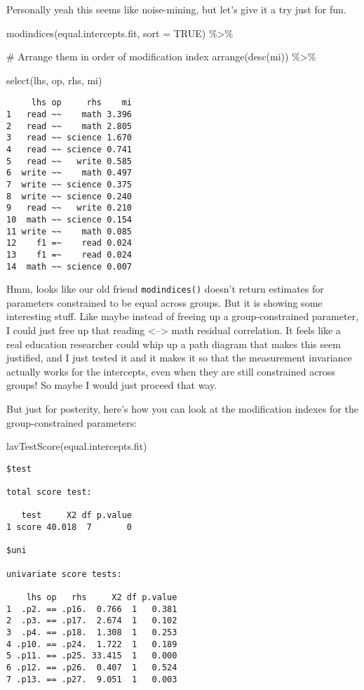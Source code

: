 \documentclass[
  letterpaper,
  DIV=11,
  numbers=noendperiod]{scrreprt}
\newenvironment{Shaded}{\begin{snugshade}}{\end{snugshade}}
\newcommand{\AttributeTok}[1]{\textcolor[rgb]{0.40,0.45,0.13}{#1}}
\newcommand{\CommentTok}[1]{\textcolor[rgb]{0.37,0.37,0.37}{#1}}
\newcommand{\ConstantTok}[1]{\textcolor[rgb]{0.56,0.35,0.01}{#1}}
\newcommand{\FunctionTok}[1]{\textcolor[rgb]{0.28,0.35,0.67}{#1}}
\newcommand{\NormalTok}[1]{\textcolor[rgb]{0.00,0.23,0.31}{#1}}
\newcommand{\SpecialCharTok}[1]{\textcolor[rgb]{0.37,0.37,0.37}{#1}}
\begin{document}
Personally yeah this seems like noise-mining, but let's give it a try
just for fun.

\begin{Shaded}
\begin{Highlighting}[]
\FunctionTok{modindices}\NormalTok{(equal.intercepts.fit, }\AttributeTok{sort =} \ConstantTok{TRUE}\NormalTok{) }\SpecialCharTok{\%\textgreater{}\%} 
  
  \CommentTok{\# Arrange them in order of modification index}
  \FunctionTok{arrange}\NormalTok{(}\FunctionTok{desc}\NormalTok{(mi)) }\SpecialCharTok{\%\textgreater{}\%} 
  
  \FunctionTok{select}\NormalTok{(lhs, op, rhs, mi)}
\end{Highlighting}
\end{Shaded}

\begin{verbatim}
     lhs op     rhs    mi
1   read ~~    math 3.396
2   read ~~    math 2.805
3   read ~~ science 1.670
4   read ~~ science 0.741
5   read ~~   write 0.585
6  write ~~    math 0.497
7  write ~~ science 0.375
8  write ~~ science 0.240
9   read ~~   write 0.210
10  math ~~ science 0.154
11 write ~~    math 0.085
12    f1 =~    read 0.024
13    f1 =~    read 0.024
14  math ~~ science 0.007
\end{verbatim}

Hmm, looks like our old friend \texttt{modindices()} doesn't return
estimates for parameters constrained to be equal across groups. But it
is showing some interesting stuff. Like maybe instead of freeing up a
group-constrained parameter, I could just free up that reading
\textless--\textgreater{} math residual correlation. It feels like a
real education researcher could whip up a path diagram that makes this
seem justified, and I just tested it and it makes it so that the
measurement invariance actually works for the intercepts, even when they
are still constrained across groups! So maybe I would just proceed that
way.

But just for posterity, here's how you can look at the modification
indexes for the group-constrained parameters:

\begin{Shaded}
\begin{Highlighting}[]
\FunctionTok{lavTestScore}\NormalTok{(equal.intercepts.fit)}
\end{Highlighting}
\end{Shaded}

\begin{verbatim}
$test

total score test:

   test     X2 df p.value
1 score 40.018  7       0

$uni

univariate score tests:

    lhs op   rhs     X2 df p.value
1  .p2. == .p16.  0.766  1   0.381
2  .p3. == .p17.  2.674  1   0.102
3  .p4. == .p18.  1.308  1   0.253
4 .p10. == .p24.  1.722  1   0.189
5 .p11. == .p25. 33.415  1   0.000
6 .p12. == .p26.  0.407  1   0.524
7 .p13. == .p27.  9.051  1   0.003
\end{verbatim}
\end{document}
